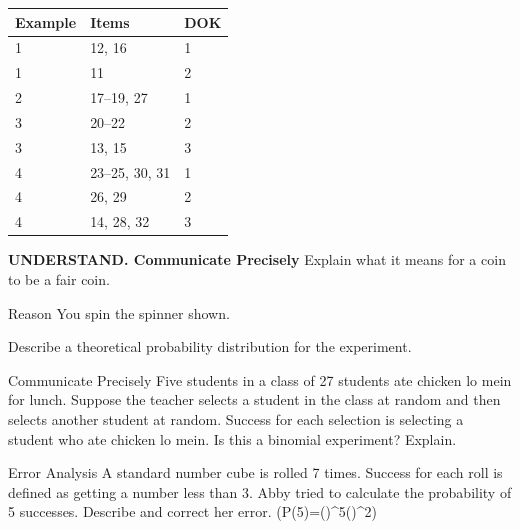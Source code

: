 \documentclass{article}
\newenvironment{item-analysis}{}{}      %
\newenvironment{practice}[2]{}{}        %
\newcommand{\answer}[1]{}               %
\newcommand{\placeholder}[2]{}          %
\begin{document}
\begin{item-analysis}
\begin{tabular}{lll}
\toprule
Example & Items & DOK \\
\midrule
1 & 12, 16 & 1 \\
1 & 11 & 2 \\
2 & 17--19, 27 & 1 \\
3 & 20--22 & 2 \\
3 & 13, 15 & 3 \\
4 & 23--25, 30, 31 & 1 \\
4 & 26, 29 & 2 \\
4 & 14, 28, 32 & 3 \\
\bottomrule
\end{tabular}
\end{item-analysis}
\begin{practice}{11}{2}
\textbf{UNDERSTAND. Communicate Precisely} Explain what it means for a coin to be a fair coin.
\answer{When you flip a fair coin, the probability of H and the probability of T are each (\frac12).}
\end{practice}
\begin{practice}{12}{1}
Reason You spin the spinner shown.
\placeholder{diagram}{Circular spinner: top-left blue quadrant labeled 4 and 90 degrees, top-right green quadrant 6 and 90 degrees, bottom orange semicircle 5 and 180 degrees. Black center arrow points into green quadrant.}
Describe a theoretical probability distribution for the experiment.
\answer{The probability distribution is the function P, defined on \{4, 5, 6\}, with (P(4)=0.25), (P(5)=0.5) and (P(6)=0.25).}
\end{practice}
\begin{practice}{13}{3}
Communicate Precisely Five students in a class of 27 students ate chicken lo mein for lunch. Suppose the teacher selects a student in the class at random and then selects another student at random. Success for each selection is selecting a student who ate chicken lo mein. Is this a binomial experiment? Explain.
\answer{No; the results of the two selections are not independent. The teacher will not choose the same student twice, therefore the second selection is being made from fewer students, so the probability of success is different.}
\end{practice}
\begin{practice}{14}{3}
Error Analysis A standard number cube is rolled 7 times. Success for each roll is defined as getting a number less than 3. Abby tried to calculate the probability of 5 successes. Describe and correct her error.
(P(5)=()^5()^2)
\placeholder{illustration}{Curled pale note showing Abby's incorrect probability expression transcribed above, with red X.}
\answer{Abby forgot to multiply by ({}_7C_5).
(P(5)={}_7C_5(\frac13)^5(\frac23)^2=21(\frac13)^5(\frac23)^2\approx0.0384).}
\end{practice}
\end{document}
